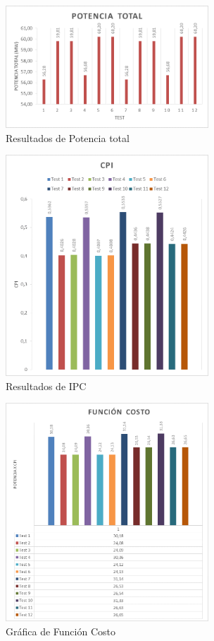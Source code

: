 \documentclass[journal]{IEEEtran}
\begin{document}
\begin{figure}[!ht]
        \begin{center}
        \includegraphics[width=3in]{fig1.png}
        \caption{Resultados de Potencia total}
        \end{center}
\end{figure}

\begin{figure}[!ht]
        \begin{center}
        \includegraphics[width=3in]{fig2.png}
        \caption{Resultados de IPC}
        \end{center}
\end{figure}

\begin{figure}[!ht]
        \begin{center}
        \includegraphics[width=3in]{fig3.png}
        \caption{Gr\'{a}fica de Funci\'{o}n Costo}
        \end{center}
\end{figure}
\end{document}
